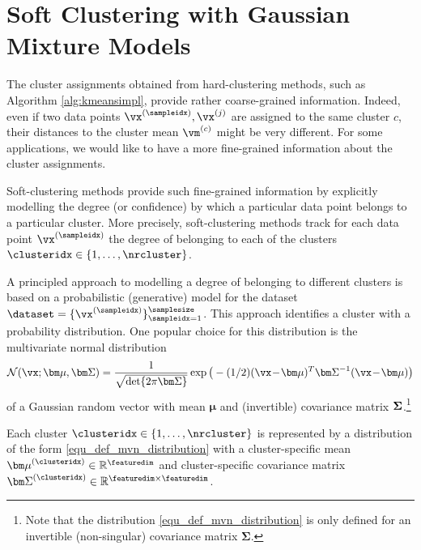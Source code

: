 \documentclass[12pt]{report}
\begin{document}
\section{Soft Clustering with Gaussian Mixture Models}
\label{sec_soft_clustering}

The cluster assignments obtained from hard-clustering 
methods, such as Algorithm \ref{alg:kmeansimpl}, provide 
rather coarse-grained information. Indeed, even if two data 
points $\vx^{(\sampleidx)}, \vx^{(j)}$ are assigned to the 
same cluster $c$, their distances to the cluster mean $\vm^{(c)}$ 
might be very different. For some applications, we would 
like to have a more fine-grained information about the cluster 
assignments. 

Soft-clustering methods provide such fine-grained information 
by explicitly modelling the degree (or confidence) by which 
a particular data point belongs to a particular cluster. More 
precisely, soft-clustering methods track for each data point 
$\vx^{(\sampleidx)}$ the degree of belonging to each of the 
clusters $\clusteridx \in \{1,\ldots,\nrcluster\}$.  

A principled approach to modelling a degree of belonging to 
different clusters is based on a probabilistic (generative) model 
for the dataset $\dataset = \{ \vx^{(\sampleidx)} \}_{\sampleidx=1}^{\samplesize}$. 
This approach identifies a cluster with a probability distribution. 
One popular choice for this distribution is the multivariate normal 
distribution 
\begin{equation}
\label{equ_def_mvn_distribution}
 \mathcal{N} (\vx ; {\bm \mu}, {\bm \Sigma}) = \frac{1}{\sqrt{{\rm det } \{ 2 \pi  {\bm \Sigma} \} }} \exp\big( - (1/2) (\vx\!-\!{\bm \mu})^{T}  {\bm \Sigma}^{-1} (\vx\!-\!{\bm \mu})  \big)
\end{equation} 
of a Gaussian random vector with mean ${\bm \mu}$ and (invertible) covariance 
matrix ${\bf \Sigma}$.\footnote{Note that the distribution \eqref{equ_def_mvn_distribution} 
is only defined for an invertible (non-singular) covariance matrix ${\bm \Sigma}$.}

Each cluster $\clusteridx \in \{1,\ldots,\nrcluster\}$ is represented by a distribution 
of the form \eqref{equ_def_mvn_distribution} with a cluster-specific mean 
${\bm \mu}^{(\clusteridx)} \in \mathbb{R}^{\featuredim}$ and cluster-specific 
covariance matrix ${\bm \Sigma}^{(\clusteridx)} \in \mathbb{R}^{\featuredim \times \featuredim}$. 
\end{document}
